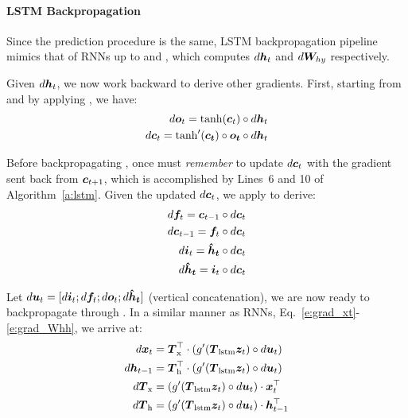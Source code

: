 \paragraph{LSTM Backpropagation}
Since the prediction procedure is the same, LSTM backpropagation pipeline mimics
that of RNNs up to  and , which computes $d\bm{h}_{t}$
and $d\bm{W}_{hy}$ respectively.

Given $d\bm{h}_{t}$, we now work backward to derive other gradients. First,
starting from  and by applying
, we have:
\begin{align}                        
d\bm{o}_{t} = \tanh(\bm{c}_{t}) \circ d\bm{h}_{t} \\
d\bm{c}_{t} = \tanh'(\bm{\bm{c}_{t}}) \circ \bm{\bm{o}_{t}} \circ d\bm{h}_{t} 
\end{align} 

Before backpropagating , once must {\it remember} to update
$d\bm{c}_{t}$ with the gradient sent back from $\bm{c}_{t+1}$, which is accomplished
by Lines~6 and 10 of Algorithm~\ref{a:lstm}. Given the updated $d\bm{c}_{t}$, we
apply  to derive: 
\begin{align}                        
d\bm{f}_{t} = \bm{c}_{t-1} \circ d\bm{c}_{t} \\
d\bm{c}_{t-1} = \bm{f}_{t} \circ d\bm{c}_{t} \\
d\bm{i}_{t} = \mbox{\boldmath{$\hat{h}_t$}} \circ d\bm{c}_{t} \\
d\mbox{\boldmath{$\hat{h}_t$}} = \bm{i}_{t} \circ d\bm{c}_{t}
\end{align} 


Let $d\bm{u}_t = [d\bm{i}_{t}; d\bm{f}_{t}; d\bm{o}_{t}; d\mbox{\boldmath{$\hat{h}_t$}}]$ (vertical concatenation), we are now ready to backpropagate through . In a similar manner as RNNs, Eq.~\ref{e:grad_xt}-\ref{e:grad_Whh}, we arrive at:
\begin{align}
d\bm{x}_{t} &=  \mbox{\boldmath{$T$}}_{\text{x}}^\top \cdot \left(g'(\mbox{\boldmath{$T$}}_{\text{lstm}} \bm{z}_{t}) \circ d\bm{u}_t\right)\\
d\bm{h}_{t-1} &=  \mbox{\boldmath{$T$}}_{\text{h}}^\top \cdot \left(g'(\mbox{\boldmath{$T$}}_{\text{lstm}} \bm{z}_{t}) \circ d\bm{u}_t\right)\\
d\mbox{\boldmath{$T$}}_{\text{x}} &=  \left(g'(\mbox{\boldmath{$T$}}_{\text{lstm}} \bm{z}_{t}) \circ d\bm{u}_t\right) \cdot \bm{x}_{t}^\top \\
d\mbox{\boldmath{$T$}}_{\text{h}} &=  \left(g'(\mbox{\boldmath{$T$}}_{\text{lstm}} \bm{z}_{t}) \circ d\bm{u}_t\right) \cdot \bm{h}_{t-1}^\top
\end{align}

